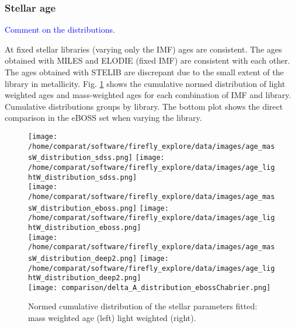 \documentclass[onecolumn]{aa}
\begin{document}
% 


\subsubsection{Stellar age}

\textcolor{blue}{Comment on the distributions.}

At fixed stellar libraries (varying only the IMF) ages are consistent. 
The ages obtained with MILES and ELODIE (fixed IMF) are consistent with each other.
The ages obtained with STELIB are discrepant due to the small extent of the library in metallicity. 
Fig. \ref{fig:distributions:MwA} shows the cumulative normed distribution of light weighted ages and mass-weighted ages for each combination of IMF and library. 
Cumulative distributions groups by library. 
The bottom plot shows the direct comparison in the eBOSS set when varying the library.  


\begin{figure}
\begin{center}
\caption{\label{fig:distributions:MwA} 
Normed cumulative distribution of the stellar parameters fitted: mass weighted age (left) light weighted (right).}  
\texttt{[image: /home/comparat/software/firefly\_explore/data/images/age\_massW\_distribution\_sdss.png]}
\texttt{[image: /home/comparat/software/firefly\_explore/data/images/age\_lightW\_distribution\_sdss.png]}\\
\texttt{[image: /home/comparat/software/firefly\_explore/data/images/age\_massW\_distribution\_eboss.png]}
\texttt{[image: /home/comparat/software/firefly\_explore/data/images/age\_lightW\_distribution\_eboss.png]}\\
\texttt{[image: /home/comparat/software/firefly\_explore/data/images/age\_massW\_distribution\_deep2.png]}
\texttt{[image: /home/comparat/software/firefly\_explore/data/images/age\_lightW\_distribution\_deep2.png]}\\
\texttt{[image: comparison/delta\_A\_distribution\_ebossChabrier.png]}
\end{center}
\end{figure}
\end{document}
